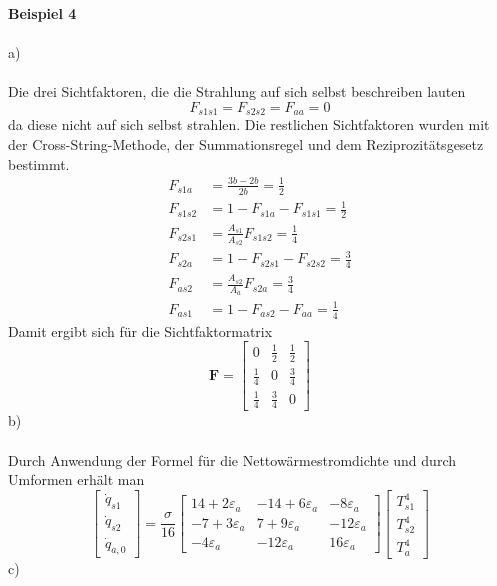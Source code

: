 \newpage
\noindent
\textbf{Beispiel 4}\\ \\
a)\\ \\
Die drei Sichtfaktoren, die die Strahlung auf sich selbst beschreiben lauten
\[
	F_{s1s1} = F_{s2s2} = F_{aa} = 0 
\]
da diese nicht auf sich selbst strahlen.
Die restlichen Sichtfaktoren wurden mit der Cross-String-Methode, der Summationsregel und dem Reziprozitätsgesetz bestimmt.
\begin{align*} 
	F_{s1a} &= \frac{3b - 2b}{2b} = \frac{1}{2} \\
	F_{s1s2} &= 1 - F_{s1a} - F_{s1s1} = \frac{1}{2} \\
	F_{s2s1} &= \frac{A_{s1}}{A_{s2}}F_{s1s2} = \frac{1}{4} \\
	F_{s2a} &= 1 - F_{s2s1} - F_{s2s2} = \frac{3}{4} \\
	F_{as2} &= \frac{A_{s2}}{A_a}F_{s2a} = \frac{3}{4} \\
	F_{as1} &= 1 - F_{as2} - F_{aa} = \frac{1}{4}
\end{align*}
Damit ergibt sich für die Sichtfaktormatrix
\[
	\textbf{F} = \begin{bmatrix}
		0 & \frac{1}{2} & \frac{1}{2} \\
		\frac{1}{4} & 0 & \frac{3}{4}\\
		\frac{1}{4} & \frac{3}{4} & 0
	\end{bmatrix}
\]
b)\\ \\
Durch Anwendung der Formel für die Nettowärmestromdichte und durch Umformen erhält man
\[
	\begin{bmatrix}
		\dot{q}_{s1} \\
		\dot{q}_{s2} \\
		\dot{q}_{a,0}
	\end{bmatrix}
	= \frac{\sigma}{16}
	\begin{bmatrix}
		14 + 2\varepsilon_a & -14 + 6\varepsilon_a & -8\varepsilon_a \\
		-7 + 3\varepsilon_a & 7 + 9\varepsilon_a & -12\varepsilon_a \\
		-4\varepsilon_a & -12\varepsilon_a & 16\varepsilon_a
	\end{bmatrix}
	\begin{bmatrix}
		T_{s1}^4 \\
		T_{s2}^4 \\
		T_a^4
	\end{bmatrix}
\]
c)\\ \\
